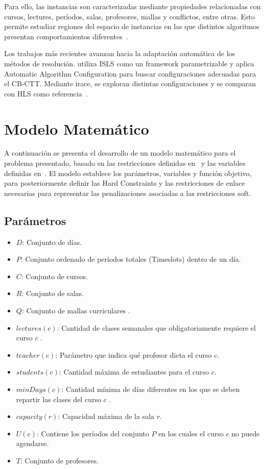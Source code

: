 \documentclass[letter, 10pt]{article}
\begin{document}
Para ello, las instancias son caracterizadas mediante propiedades relacionadas con cursos, lectures, per\'iodos, salas, profesores, mallas y conflictos, entre otras. Esto permite estudiar regiones del espacio de instancias en las que distintos algoritmos presentan comportamientos diferentes~\cite{DeCoster2022AlgorithmSelection}.

Los trabajos m\'as recientes avanzan hacia la adaptaci\'on autom\'atica de los m\'etodos de resoluci\'on. \cite{Feutrier2023Landscape} utiliza ISLS como un framework parametrizable y aplica Automatic Algorithm Configuration para buscar configuraciones adecuadas para el CB-CTT. Mediante irace, se exploran distintas configuraciones y se comparan con HLS como referencia~\cite{Feutrier2023Landscape}.



\section{Modelo Matem\'atico}
A continuaci\'on se presenta el desarrollo de un modelo matem\'atico para el problema presentado, basado en las restricciones definidas en~\cite{DiGaspero2007ITC} y las variables definidas en~\cite{Hao2011LowerBounds}. El modelo establece los par\'ametros, variables y funci\'on objetivo, para posteriormente definir las Hard Constraints y las restricciones de enlace necesarias para representar las penalizaciones asociadas a las restricciones soft.

\subsection{Par\'ametros}
\begin{itemize}
    \item $D$: Conjunto de d\'ias.
    \item $P$: Conjunto ordenado de per\'iodos totales (Timeslots) dentro de un d\'ia.
    \item $C$: Conjunto de cursos.
    \item $R$: Conjunto de salas.
    \item $Q$: Conjunto de mallas curriculares .
    \item $lectures(c)$: Cantidad de clases semanales que obligatoriamente requiere el curso $c$ .
    \item $teacher(c)$: Par\'ametro que indica qu\'e profesor dicta el curso $c$.
    \item $students(c)$: Cantidad m\'axima de estudiantes para el curso $c$.
    \item $minDays(c)$: Cantidad m\'inima de d\'ias diferentes en los que se deben repartir las clases del curso $c$ .
    \item $capacity(r)$: Capacidad m\'axima de la sala $r$.
    \item $U(c)$: Contiene los per\'iodos del conjunto $P$ en los cuales el curso $c$ no puede agendarse.
    \item $T$: Conjunto de profesores.

\end{itemize}
\end{document}
